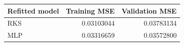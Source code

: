 \begin{center}\small
\begin{tabular}{lrr}
\toprule
Refitted model & Training MSE & Validation MSE \\
\midrule
RKS & 0.03103044 & 0.03783134 \\
MLP & 0.03316659 & 0.03572800 \\
\bottomrule
\end{tabular}\end{center}
